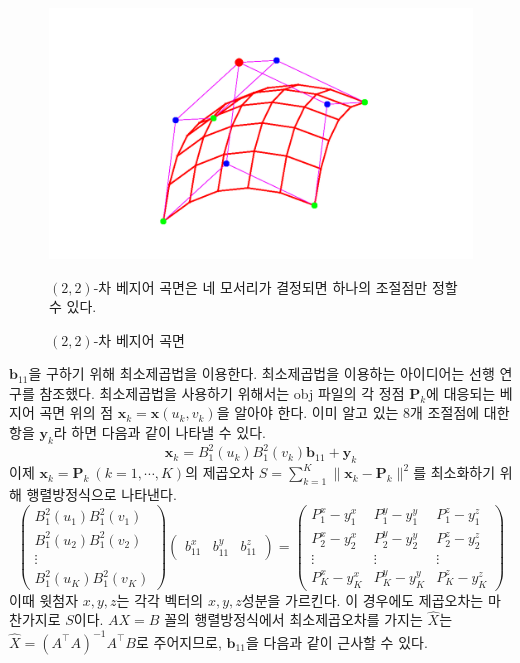 \documentclass{gshs_thesis}
\theoremstyle{theorem}
\theoremstyle{lemma}
\theoremstyle{definition}
\begin{document}
\begin{figure}[h]
	\centering
	\includegraphics[width=.8\textwidth]{image/22BS}
	\caption{$(2,2)$-차 베지어 곡면}
	\small $(2,2)$-차 베지어 곡면은 네 모서리가 결정되면 하나의 조절점만 정할 수 있다. 
	\label{3D control}
\end{figure}
$\mathbf{b}_{11}$을 구하기 위해 최소제곱법을 이용한다. 
최소제곱법을 이용하는 아이디어는 선행 연구를 참조했다.\cite{2021} 최소제곱법을 사용하기 위해서는 obj 파일의 각 정점 $\mathbf{P}_k$에 대응되는 베지어 곡면 위의 점 $\mathbf{x}_k=\mathbf{x}(u_k, v_k)$을 알아야 한다. 이미 알고 있는 8개 조절점에 대한 항을 $\mathbf{y}_k$라 하면 다음과 같이 나타낼 수 있다. 
\begin{equation*}
	\mathbf{x}_k=B_1^2(u_k)B_1^2(v_k)\mathbf{b}_{11}+\mathbf{y}_k
\end{equation*}
이제 $\mathbf{x}_k=\mathbf{P}_k\ (k=1, \cdots, K)$의 제곱오차 $S=\sum_{k=1}^K \| \mathbf{x}_k-\mathbf{P}_k \|^2$를 최소화하기 위해 행렬방정식으로 나타낸다.
\begin{equation*}
	\begin{pmatrix}
		B_1^2(u_1)B_1^2(v_1) \\ B_1^2(u_2)B_1^2(v_2) \\ \vdots \\ B_1^2(u_K)B_1^2(v_K)
	\end{pmatrix} \begin{pmatrix}
		b_{11}^x & b_{11}^y & b_{11}^z
	\end{pmatrix} = \begin{pmatrix}
		P_1^x-y_1^x & P_1^y-y_1^y & P_1^z-y_1^z \\ P_2^x-y_2^x & P_2^y-y_2^y & P_2^z-y_2^z \\ \vdots & \vdots & \vdots \\ P_K^x-y_K^x & P_K^y-y_K^y & P_K^z-y_K^z
	\end{pmatrix}
\end{equation*}
이때 윗첨자 $x, y, z$는 각각 벡터의 $x, y, z$성분을 가르킨다. 이 경우에도 제곱오차는 마찬가지로 $S$이다. $AX=B$ 꼴의 행렬방정식에서 최소제곱오차를 가지는 $\hat{X}$는 $\hat{X}=(A^\intercal A)^{-1}A^\intercal B$로 주어지므로, $\mathbf{b}_{11}$을 다음과 같이 근사할 수 있다. 
\end{document}
